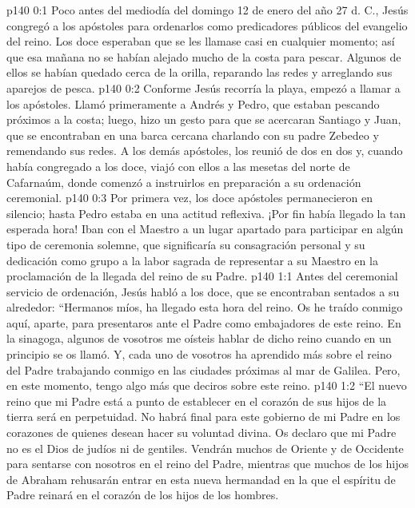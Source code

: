 \author{Comisión de seres intermedios}
\vs p140 0:1 Poco antes del mediodía del domingo 12 de enero del año 27 d. C., Jesús congregó a los apóstoles para ordenarlos como predicadores públicos del evangelio del reino. Los doce esperaban que se les llamase casi en cualquier momento; así que esa mañana no se habían alejado mucho de la costa para pescar. Algunos de ellos se habían quedado cerca de la orilla, reparando las redes y arreglando sus aparejos de pesca.
\vs p140 0:2 Conforme Jesús recorría la playa, empezó a llamar a los apóstoles. Llamó primeramente a Andrés y Pedro, que estaban pescando próximos a la costa; luego, hizo un gesto para que se acercaran Santiago y Juan, que se encontraban en una barca cercana charlando con su padre Zebedeo y remendando sus redes. A los demás apóstoles, los reunió de dos en dos y, cuando había congregado a los doce, viajó con ellos a las mesetas del norte de Cafarnaúm, donde comenzó a instruirlos en preparación a su ordenación ceremonial.
\vs p140 0:3 Por primera vez, los doce apóstoles permanecieron en silencio; hasta Pedro estaba en una actitud reflexiva. ¡Por fin había llegado la tan esperada hora! Iban con el Maestro a un lugar apartado para participar en algún tipo de ceremonia solemne, que significaría su consagración personal y su dedicación como grupo a la labor sagrada de representar a su Maestro en la proclamación de la llegada del reino de su Padre.
\vs p140 1:1 Antes del ceremonial servicio de ordenación, Jesús habló a los doce, que se encontraban sentados a su alrededor: “Hermanos míos, ha llegado esta hora del reino. Os he traído conmigo aquí, aparte, para presentaros ante el Padre como embajadores de este reino. En la sinagoga, algunos de vosotros me oísteis hablar de dicho reino cuando en un principio se os llamó. Y, cada uno de vosotros ha aprendido más sobre el reino del Padre trabajando conmigo en las ciudades próximas al mar de Galilea. Pero, en este momento, tengo algo más que deciros sobre este reino.
\vs p140 1:2 “El nuevo reino que mi Padre está a punto de establecer en el corazón de sus hijos de la tierra será en perpetuidad. No habrá final para este gobierno de mi Padre en los corazones de quienes desean hacer su voluntad divina. Os declaro que mi Padre no es el Dios de judíos ni de gentiles. Vendrán muchos de Oriente y de Occidente para sentarse con nosotros en el reino del Padre, mientras que muchos de los hijos de Abraham rehusarán entrar en esta nueva hermandad en la que el espíritu de Padre reinará en el corazón de los hijos de los hombres.

